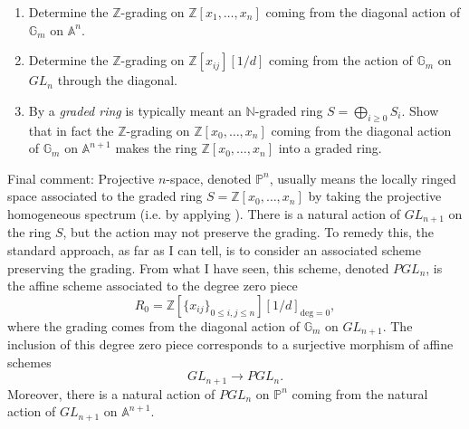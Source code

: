 \documentclass[12pt]{article}
\theoremstyle{definition}
\theoremstyle{theorem}
\begin{document}
\begin{enumerate}[label=\textbf{\arabic*.}]
\item Determine the $\mathbb{Z}$-grading on $\mathbb{Z}[x_1, \ldots, x_n]$ coming from the diagonal action of $\mathbb{G}_m$ on $\mathbb{A}^n$. 
\item Determine the $\mathbb{Z}$-grading on $\mathbb{Z}[x_{ij}][1/d]$ coming from the action of $\mathbb{G}_m$ on $GL_n$ through the diagonal. 
\item By a \emph{graded ring} is typically meant an $\mathbb{N}$-graded ring $S = \bigoplus_{i \geqslant 0} S_i$. Show that in fact the $\mathbb{Z}$-grading on $\mathbb{Z}[x_0, \ldots, x_n]$ coming from the diagonal action of $\mathbb{G}_m$ on $\mathbb{A}^{n+1}$ makes the ring $\mathbb{Z}[x_0, \ldots, x_n]$ into a graded ring. 
\end{enumerate}

\noindent Final comment: Projective $n$-space, denoted $\mathbb{P}^n$, usually means the locally ringed space associated to the graded ring $S = \mathbb{Z}[x_0, \ldots, x_n]$ by taking the projective homogeneous spectrum (i.e. by applying ). There is a natural action of $GL_{n+1}$ on the ring $S$, but the action may not preserve the grading. To remedy this, the standard approach, as far as I can tell, is to consider an associated scheme preserving the grading. From what I have seen, this scheme, denoted $PGL_n$, is the affine scheme associated to the degree zero piece
\[
R_0 = \mathbb{Z}[\{x_{ij}\}_{0 \leqslant i,j \leqslant n}][1/d]_{\text{deg} = 0},
\] 
where the grading comes from the diagonal action of $\mathbb{G}_m$ on $GL_{n+1}$.  The inclusion of this degree zero piece corresponds to a surjective morphism of affine schemes 
\[
GL_{n+1} \to PGL_n.
\]
Moreover, there is a natural action of $PGL_n$ on $\mathbb{P}^n$ coming from the natural action of $GL_{n+1}$ on $\mathbb{A}^{n+1}$.
\end{document}
